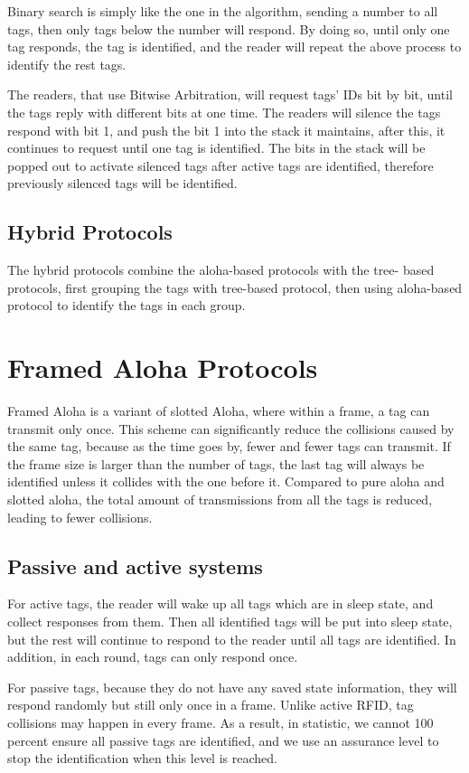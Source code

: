 \documentclass[12pt,letterpaper]{article}
\begin{document}
Binary search is simply like the one in the algorithm, sending a number
to all tags, then only tags below the number will respond. By doing so,
until only one tag responds, the tag is identified, and the reader will
repeat the above process to identify the rest tags.

The readers, that use Bitwise Arbitration, will request tags' IDs bit by bit,
until the tags reply with different bits at one time. The readers will silence
the tags respond with bit 1, and push the bit 1 into the stack it maintains,
after this, it continues to request until one tag is identified. The bits in
the stack will be popped out to activate silenced tags after active tags are 
identified, therefore previously silenced tags will be identified.

\subsection{Hybrid Protocols}
The hybrid protocols combine the aloha-based protocols with the tree-
based protocols, first grouping the tags with tree-based protocol, then
using aloha-based protocol to identify the tags in each group.


\section{Framed Aloha Protocols}
Framed Aloha is a variant of slotted Aloha, where within a frame, a tag
can transmit only once\cite{frame}. This scheme can significantly 
reduce the collisions caused by the same tag, because as the time 
goes by, fewer and fewer tags can transmit. If the frame size
is larger than the number of tags, the last tag will always be identified
unless it collides with the one before it. Compared to pure aloha and
slotted aloha, the total amount of transmissions from all the tags is
reduced, leading to fewer collisions.

\subsection{Passive and active systems}
For active tags, the reader will wake up all tags which are in sleep state, 
and collect responses from them. Then all identified tags will be put 
into sleep state, but the rest will continue to respond to the reader 
until all tags are identified. In addition, in each round, tags can only 
respond once. 

For passive tags, because they do not have any saved state information,
they will respond randomly but still only once in a frame. Unlike active
RFID, tag collisions may happen in every frame. As a result, in statistic,
we cannot 100 percent ensure all passive tags are identified, and we 
use an assurance level to stop the identification when this level is 
reached\cite{frame}.
\end{document}
